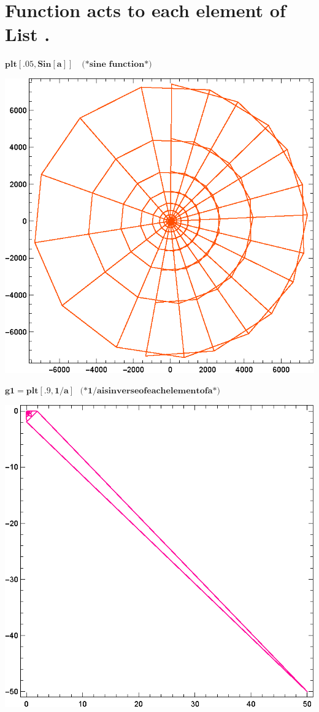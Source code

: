 \documentclass{article}
\begin{document}
\section*{Function { }acts { }to { }each { }element { }of { }List .}

\begin{doublespace}
\noindent\(\pmb{\text{plt}[.05,\text{Sin}[a]]\quad \text{(*sine function*)}}\)
\end{doublespace}

\includegraphics{functions_on_complex-plane_gr4.eps}

\begin{doublespace}
\noindent\(\pmb{\text{g1}=\text{plt}[.9,1/a]\text{  }\text{(*}1/a \text{is} \text{inverse} \text{of} \text{each} \text{element} \text{of} a\text{*)}}\)
\end{doublespace}

\includegraphics{functions_on_complex-plane_gr5.eps}
\end{document}
